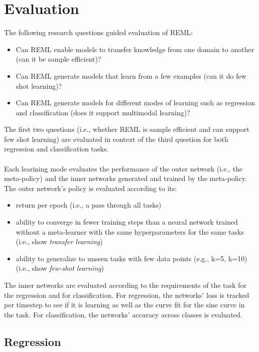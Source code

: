 \chapter{Evaluation}
\label{Evaluation}
The following research questions guided evaluation of REML:
\begin{itemize}
    \item Can REML enable models to transfer knowledge from one domain 
    to another (can it be sample efficient)? 
    \item Can REML generate models that learn from a few examples 
    (can it do few shot learning)? 
    \item Can REML generate models for different modes of learning such 
    as regression and classification (does it support multimodal learning)?
\end{itemize}
The first two questions (i.e., whether REML is sample efficient and can 
support few shot learning) are evaluated in context of the third question 
for both regression and classification tasks. 
\\\\
Each learining mode evaluates the performance of the outer network (i.e., the 
meta-policy) and the inner networks generated and trained by the meta-policy. 
The outer network's policy is evaluated according to its:
\begin{itemize}
    \item return per epoch (i.e., a pass through all tasks)
    \item ability to converge in fewer training steps than a neural network trained 
    without a meta-learner with the same hyperparameters for the same tasks (i.e.,
    show \textit{transfer learning})
    \item ability to generalize to unseen tasks with few data points (e.g., k=5,
    k=10) (i.e., show \textit{few-shot learning})
\end{itemize}
The inner networks are evaluated according to the requirements of the task
for the regression and for classification. For regression, the networks'
loss is tracked per timestep to see if it is learning as well as the curve fit
for the sine curve in the task. For classification, the networks' accuracy across
classes is evaluated.
\section{Regression}
